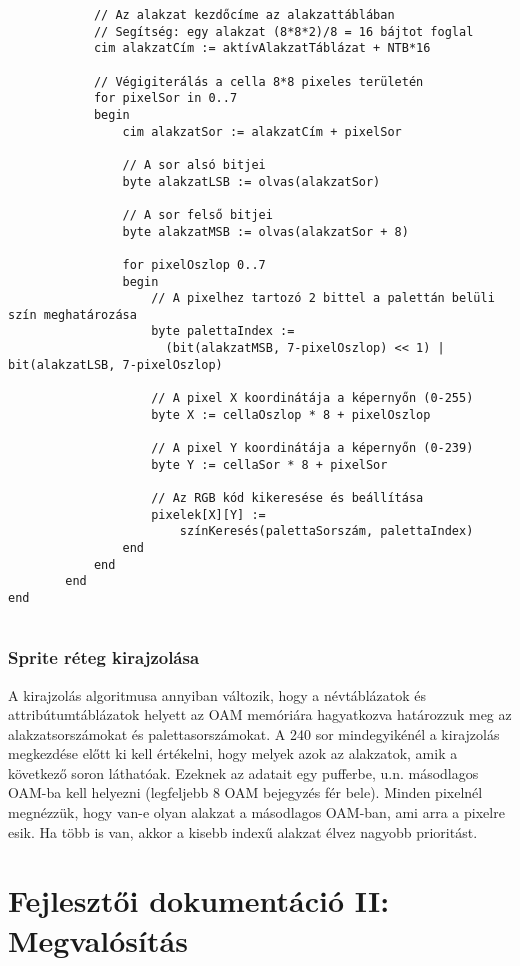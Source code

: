 \begin{lstlisting}
			// Az alakzat kezdőcíme az alakzattáblában
			// Segítség: egy alakzat (8*8*2)/8 = 16 bájtot foglal
			cim alakzatCím := aktívAlakzatTáblázat + NTB*16
				
			// Végigiterálás a cella 8*8 pixeles területén
			for pixelSor in 0..7
			begin
				cim alakzatSor := alakzatCím + pixelSor
				
				// A sor alsó bitjei
				byte alakzatLSB := olvas(alakzatSor)
				
				// A sor felső bitjei		
				byte alakzatMSB := olvas(alakzatSor + 8)
				
				for pixelOszlop 0..7
				begin
					// A pixelhez tartozó 2 bittel a palettán belüli szín meghatározása
					byte palettaIndex := 
					  (bit(alakzatMSB, 7-pixelOszlop) << 1) | bit(alakzatLSB, 7-pixelOszlop)
					
					// A pixel X koordinátája a képernyőn (0-255)
					byte X := cellaOszlop * 8 + pixelOszlop
					
					// A pixel Y koordinátája a képernyőn (0-239)
					byte Y := cellaSor * 8 + pixelSor
				
					// Az RGB kód kikeresése és beállítása
					pixelek[X][Y] := 
						színKeresés(palettaSorszám, palettaIndex)
				end
			end
		end
end


\end{lstlisting}

\subsection{Sprite réteg kirajzolása}

A kirajzolás algoritmusa annyiban változik, hogy a névtáblázatok és attribútumtáblázatok helyett az OAM memóriára hagyatkozva határozzuk meg az alakzatsorszámokat és palettasorszámokat.
A 240 sor mindegyikénél a kirajzolás megkezdése előtt ki kell értékelni, hogy melyek azok az alakzatok, amik a következő soron láthatóak. Ezeknek az adatait egy pufferbe, u.n. másodlagos OAM-ba kell helyezni (legfeljebb 8 OAM bejegyzés fér bele). Minden pixelnél megnézzük, hogy van-e olyan alakzat a másodlagos OAM-ban, ami arra a pixelre esik. Ha több is van, akkor a kisebb indexű alakzat élvez nagyobb prioritást. 

\clearpage

\chapter{Fejlesztői dokumentáció II: Megvalósítás} %

